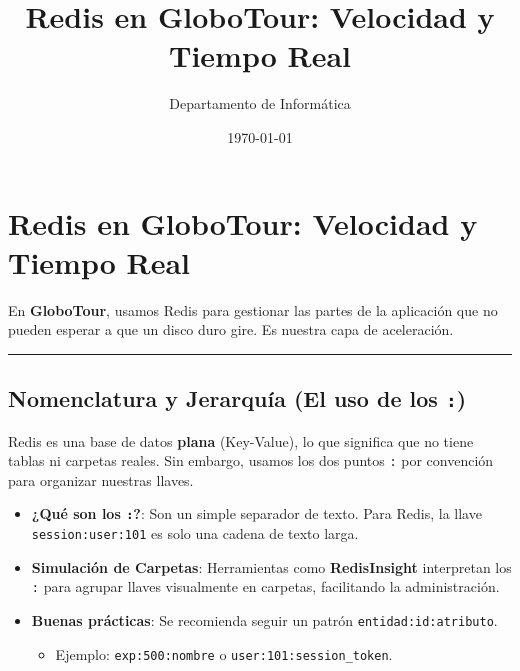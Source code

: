\documentclass[12pt,a4paper]{article}
\title{\textbf{Redis en GloboTour: Velocidad y Tiempo Real}}
\author{Departamento de Informática}
\date{\today}
\providecommand{\tightlist}{%
  \setlength{\itemsep}{0pt}\setlength{\parskip}{0pt}}
\begin{document}
\maketitle

\hypertarget{redis-en-globotour-velocidad-y-tiempo-real}{%
\section{Redis en GloboTour: Velocidad y Tiempo
Real}\label{redis-en-globotour-velocidad-y-tiempo-real}}

En \textbf{GloboTour}, usamos Redis para gestionar las partes de la
aplicación que no pueden esperar a que un disco duro gire. Es nuestra
capa de aceleración.

\begin{center}\rule{0.5\linewidth}{0.5pt}\end{center}

\hypertarget{nomenclatura-y-jerarquuxeda-el-uso-de-los}{%
\subsection{\texorpdfstring{Nomenclatura y Jerarquía (El uso de los
\texttt{:})}{1. Nomenclatura y Jerarquía (El uso de los :)}}\label{nomenclatura-y-jerarquuxeda-el-uso-de-los}}

Redis es una base de datos \textbf{plana} (Key-Value), lo que significa
que no tiene tablas ni carpetas reales. Sin embargo, usamos los dos
puntos \texttt{:} por convención para organizar
nuestras llaves.

\begin{itemize}
\tightlist
\item
  \textbf{¿Qué son los \texttt{:}?}: Son un simple
  separador de texto. Para Redis, la llave
  \texttt{session:user:101} es solo una cadena de
  texto larga.
\item
  \textbf{Simulación de Carpetas}: Herramientas como
  \textbf{RedisInsight} interpretan los \texttt{:} para
  agrupar llaves visualmente en carpetas, facilitando la administración.
\item
  \textbf{Buenas prácticas}: Se recomienda seguir un patrón
  \texttt{entidad:id:atributo}.

  \begin{itemize}
  \tightlist
  \item
    Ejemplo: \texttt{exp:500:nombre} o
    \texttt{user:101:session\_token}.
  \end{itemize}
\end{itemize}
\end{document}
